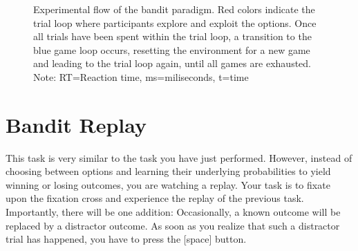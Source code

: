 \documentclass[12pt, oneside]{scrartcl}
\newcommand{\descrTextWidth}{4cm}
\begin{document}
\begin{figure}[h!]
\begin{center}
{
} %
\captionsetup{width=1\linewidth, format=plain}
\caption[Flow Bandit Paradigm]{Experimental flow of the bandit paradigm. Red colors indicate the trial loop where participants explore and exploit the options. Once all trials have been spent within the trial loop, a transition to the blue game loop occurs, resetting the environment for a new game and leading to the trial loop again, until all games are exhausted. Note: RT=Reaction time, ms=miliseconds, t=time}
\label{fig:banditFlow}
\end{center}
\end{figure}




\pagebreak
\section{Bandit Replay}

This task is very similar to the task you have just performed. However, instead of choosing between options and learning their underlying probabilities to yield winning or losing outcomes, you are watching a replay. Your task is to fixate upon the fixation cross and experience the replay of the previous task. Importantly, there will be one addition: Occasionally, a known outcome will be replaced by a distractor outcome. As soon as you realize that such a distractor trial has happened, you have to press the [space] button. \\
\end{document}
